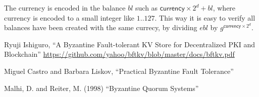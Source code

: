 \documentclass[10pt,fleqn]{article}
\begin{document}
The currency is encoded in the balance $bl$ such as $\textsf{currency} \times 2^d + bl$, where \textsf{currency} is encoded to a small integer like $1..127$. This way it is easy to verify all balances have been created with the same currecy, by dividing $ebl$ by $g^{\textsf{currency} \times 2^d}$.


\begin{thebibliography}{99}

  Ryuji Ishiguro, ``A Byzantine Fault-tolerant KV Store for Decentralized PKI and Blockchain'' \url{https://github.com/yahoo/bftkv/blob/master/docs/bftkv.pdf}

  Miguel Castro and Barbara Liskov, ``Practical Byzantine Fault Tolerance''

  Malhi, D. and Reiter, M. (1998) ``Byzantine Quorum Systems''


\end{thebibliography}
\end{document}
